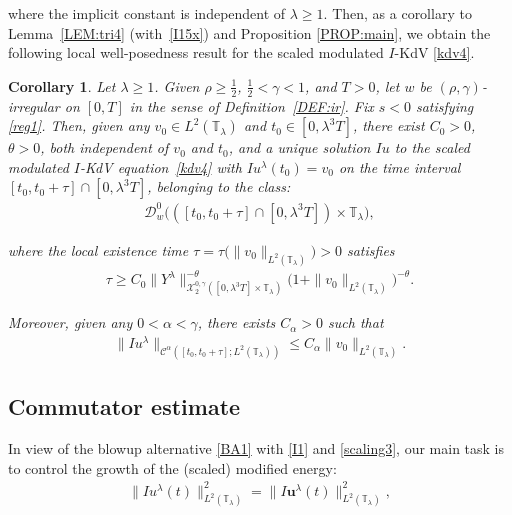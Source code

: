\documentclass[letterpaper, 11pt,  reqno]{amsart}
\newtheorem{corollary}[theorem]{Corollary}
\newcommand{\1}{\hspace{0.5mm}\text{I}\hspace{0.5mm}}
\newcommand{\noi}{\noindent}
\newcommand{\T}{\mathbb{T}}
\newcommand{\CC}{\mathcal{C}}
\newcommand{\al}{\alpha}
\newcommand{\g}{\gamma}
\newcommand{\ld}{\lambda}
\newcommand{\ta}{\theta}
\newcommand{\cX}{\mathcal{X}}
\newcommand{\cD}{\mathscr{D}}
\newcommand{\uu}{\mathbf{u}}
\numberwithin{equation}{section}
\numberwithin{theorem}{section}
\begin{document}
\noi
where the implicit constant is independent of $\ld \ge 1$.
Then, 
as a corollary to Lemma~\ref{LEM:tri4} (with~\eqref{I15x})
and Proposition \ref{PROP:main}, 
we obtain the following local well-posedness
result for the scaled modulated $I$-KdV \eqref{kdv4}.


\begin{corollary}
\label{COR:I2}
Let $\ld \ge 1$.
Given $\rho \ge\frac 12$,  $\frac 12 < \g < 1$, and $T> 0$, 
let  $w$ be $(\rho,\g)$-irregular
on $[0, T]$ 
 in the sense of Definition~\ref{DEF:ir}.
Fix  $s < 0$ satisfying \eqref{reg1}.
Then, given any 
$v_0 \in L^2(\T_\ld)$ and  $t_0 \in [0, \ld^3 T]$, 
there exist $C_0 > 0$, $\ta > 0$, both independent of $v_0$ and $t_0$, 
and a unique solution $Iu$
to 
the scaled modulated $I$-KdV equation~\eqref{kdv4} 
with $I u^\ld (t_0)= v_0$
on the time interval $[t_0, t_0 + \tau]\cap [0, \ld^3 T]$,  
belonging to the class\textup{:}
\begin{align*}
 \cD_{w}^0\big( ([t_0, t_0 + \tau] \cap [0, \ld^3 T]) \times \T_\ld\big), 
\end{align*}


\noi
where the local existence time 
$\tau = \tau \big(\| v_0 \|_{L^2(\T_\ld)}\big)> 0$ satisfies
\begin{align}
\tau  \ge C_0 \|Y^\ld\|_{\cX^{0,\g}_2([0, \ld^3 T]\times \T_\ld)}^{-\ta} \big( 1 + \| v_0 \|_{L^2(\T_\ld)}\big)^{-\ta}.
\label{ME0a}
\end{align}

\noi
Moreover, given any $0 < \al < \g$, 
there exists $C_\al > 0$ such that 
\begin{align}
 \| Iu^\ld \|_{\CC^\al ([t_0, t_0 + \tau];L^2(\T_\ld))}\le C_\al 
 \|v_0\|_{L^2(\T_\ld)}.
\label{ME0b}
\end{align}

\noi




\end{corollary}









\subsection{Commutator estimate}
\label{SUBSEC:I3}




In view of the blowup alternative \eqref{BA1}
with \eqref{I1} and \eqref{scaling3}, 
our main task is to control the growth
of the (scaled) modified energy:
\begin{align}
\| I u^\ld(t)\|_{L^2(\T_\ld)}^2 = \| I \uu^\ld(t)\|_{L^2(\T_\ld)}^2, 
\label{ME1}
\end{align}
\end{document}
